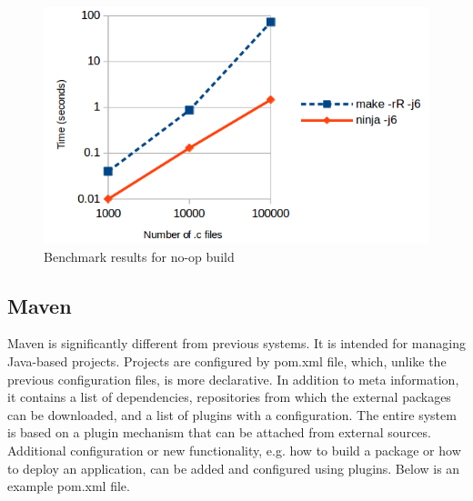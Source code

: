 \begin{figure}
\centering
\includegraphics[scale=0.70]{./no-op-build.png}
\caption{Benchmark results for no-op build \cite{BENCHMARK}}
\end{figure}

\hypertarget{maven}{%
\subsection{Maven}\label{maven}}

Maven is significantly different from previous systems. It is intended
for managing Java-based projects. Projects are configured by pom.xml
file, which, unlike the previous configuration files, is more
declarative. In addition to meta information, it contains a list of
dependencies, repositories from which the external packages can be
downloaded, and a list of plugins with a configuration. The entire system
is based on a plugin mechanism that can be attached from external
sources. Additional configuration or new functionality, e.g. how to
build a package or how to deploy an application, can be added and
configured using plugins. Below is an example pom.xml file.


